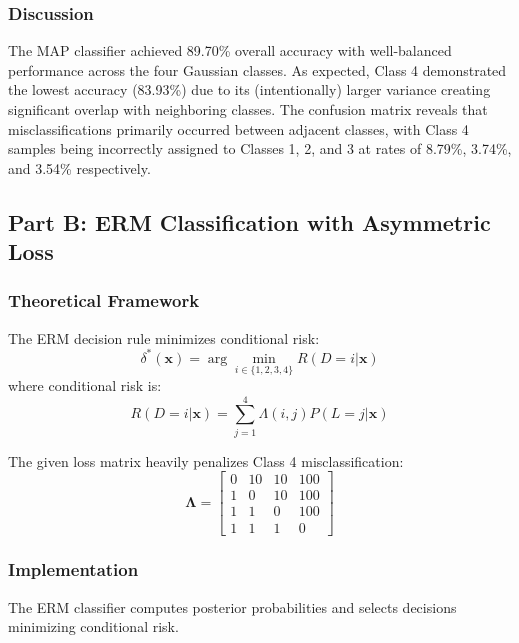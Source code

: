 \documentclass[12pt]{article}
\begin{document}
\subsubsection{Discussion}
The MAP classifier achieved 89.70\% overall accuracy with well-balanced performance across the four Gaussian classes. As expected, Class 4 demonstrated the lowest accuracy (83.93\%) due to its (intentionally) larger variance creating significant overlap with neighboring classes. The confusion matrix reveals that misclassifications primarily occurred between adjacent classes, with Class 4 samples being incorrectly assigned to Classes 1, 2, and 3 at rates of 8.79\%, 3.74\%, and 3.54\% respectively.

\subsection{Part B: ERM Classification with Asymmetric Loss}

\subsubsection{Theoretical Framework}
The ERM decision rule minimizes conditional risk:
\begin{equation}
\delta^*(\mathbf{x}) = \arg\min_{i \in \{1,2,3,4\}} R(D=i|\mathbf{x})
\end{equation}
where conditional risk is:
\begin{equation}
R(D=i|\mathbf{x}) = \sum_{j=1}^{4} \Lambda(i,j) P(L=j|\mathbf{x})
\end{equation}

The given loss matrix heavily penalizes Class 4 misclassification:
\[
\boldsymbol{\Lambda} = 
\begin{bmatrix}
0 & 10 & 10 & 100 \\
1 & 0 & 10 & 100 \\
1 & 1 & 0 & 100 \\
1 & 1 & 1 & 0
\end{bmatrix}
\]

\subsubsection{Implementation}
The ERM classifier computes posterior probabilities and selects decisions minimizing conditional risk.
\end{document}
